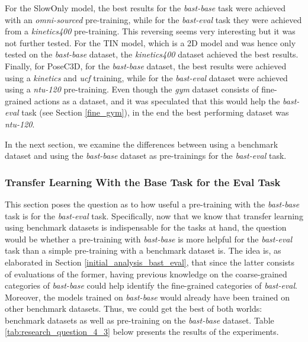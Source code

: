 \documentclass[extern,palatino]{cgMA}
\begin{document}
\noindent For the SlowOnly model, the best results for the \textit{bast-base} task were achieved with an \textit{omni-sourced} pre-training, while for the \textit{bast-eval} task they were achieved from a \textit{kinetics400} pre-training. This reversing seems very interesting but it was not further tested. For the TIN model, which is a 2D model and was hence only tested on the \textit{bast-base} dataset, the \textit{kinetics400} dataset achieved the best results. Finally, for PoseC3D, for the \textit{bast-base} dataset, the best results were achieved using a \textit{kinetics} and \textit{ucf} training, while for the \textit{bast-eval} dataset were achieved using a \textit{ntu-120} pre-training. Even though the \textit{gym} dataset consists of fine-grained actions as a dataset, and it was speculated that this would help the \textit{bast-eval} task (see Section \ref{fine_gym}), in the end the best performing dataset was \textit{ntu-120}.

\noindent In the next section, we examine the differences between using a benchmark dataset and using the \textit{bast-base} dataset as pre-trainings for the \textit{bast-eval} task.

\subsubsection{Transfer Learning With the Base Task for the Eval Task}
\label{research_question_4_3}

This section poses the question as to how useful a pre-training with the \textit{bast-base} task is for the \textit{bast-eval} task. Specifically, now that we know that transfer learning using benchmark datasets is indispensable for the tasks at hand, the question would be whether a pre-training with \textit{bast-base} is more helpful for the \textit{bast-eval} task than a simple pre-training with a benchmark dataset is. The idea is, as elaborated in Section \ref{initial_analysis_bast_eval}, that since the latter consists of evaluations of the former, having previous knowledge on the coarse-grained categories of \textit{bast-base} could help identify the fine-grained categories of \textit{bast-eval}. Moreover, the models trained on \textit{bast-base} would already have been trained on other benchmark datasets. Thus, we could get the best of both worlds: benchmark datasets as well as pre-training on the \textit{bast-base} dataset. Table \ref{tab:research_question_4_3} below presents the results of the experiments.
\end{document}
